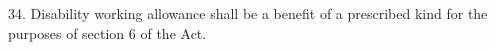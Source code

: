 \documentclass[a4paper,12pt]{article}
\begin{document}
34.  Disability working allowance shall be a benefit of a prescribed kind for the purposes of section 6 of the Act.

%
%
%
%
%
%
%
\end{document}
